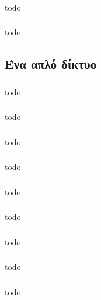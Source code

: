 \documentclass[a4paper, 12pt]{article}
\begin{document}
		\subsubsection{}
			todo

		\subsubsection{}
			todo

	\subsection{Ένα απλό δίκτυο}

		\subsubsection{}
			todo

		\subsubsection{}
			todo

		\subsubsection{}
			todo

		\subsubsection{}
			todo

		\subsubsection{}
			todo

		\subsubsection{}
			todo

		\subsubsection{}
			todo

		\subsubsection{}
			todo

		\subsubsection{}
			todo
\end{document}
